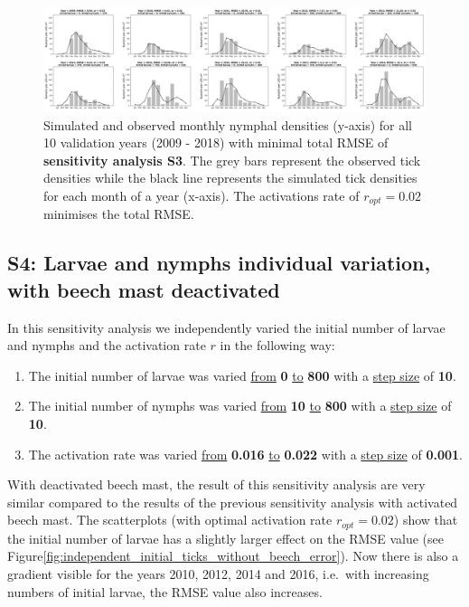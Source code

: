 \documentclass[a4paper, 11pt]{scrartcl}
\begin{document}
\begin{figure}[h!]
\centering
\includegraphics[width=\linewidth]{figures/independent_initial_ticks_with_beech}
\caption{Simulated and observed monthly nymphal densities (y-axis) for all 10 validation years (2009 - 2018) with minimal total RMSE of \textbf{sensitivity analysis S3}. The grey
bars represent the observed tick densities while the black line represents the simulated tick densities for each month of a year (x-axis). The activations rate of
$r_{opt}= 0.02$ minimises the total RMSE.}
\label{fig:independent_initial_ticks_with_beech}
\end{figure}


\subsection{S4: Larvae and nymphs individual variation, with beech mast deactivated}
In this sensitivity analysis we independently varied the initial number of larvae and nymphs and the activation rate $r$ in the following way:

\begin{enumerate}
\item The initial number of larvae was varied \underline{from} \textbf{0} \underline{to} \textbf{800} with a \underline{step size} of \textbf{10}.
\item The initial number of nymphs was varied \underline{from} \textbf{10} \underline{to} \textbf{800} with a \underline{step size} of \textbf{10}.
\item The activation rate was varied \underline{from} \textbf{0.016} \underline{to} \textbf{0.022} with a \underline{step size} of \textbf{0.001}.
\end{enumerate}

With deactivated beech mast, the result of this sensitivity analysis are very similar compared to the results of the previous sensitivity analysis with activated beech mast.
The scatterplots (with optimal activation rate $r_{opt}= 0.02$) show that the initial number of larvae has a slightly larger effect on the RMSE value (see
Figure\ref{fig:independent_initial_ticks_without_beech_error}). Now there is also a gradient visible for the years 2010, 2012, 2014 and 2016, i.e.\ with increasing numbers of
initial larvae, the RMSE value also increases.
\end{document}
